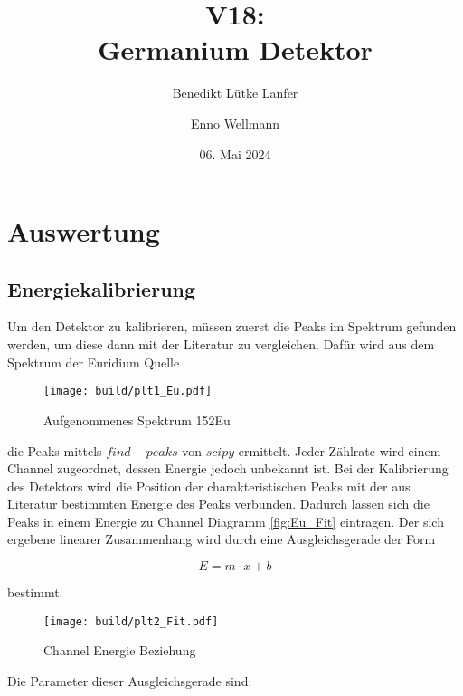 

\title{V18:\\ Germanium Detektor}
\author{Benedikt Lütke Lanfer \and Enno Wellmann}
\date{06. Mai 2024}
\publishers{TU Dortmund – Fakultät Physik}



\tableofcontents
\newpage



\newpage
\section{Auswertung}
\subsection{Energiekalibrierung}
Um den Detektor zu kalibrieren, müssen zuerst die Peaks im Spektrum gefunden
werden, um diese dann mit der Literatur zu vergleichen. Dafür wird aus dem
Spektrum der Euridium Quelle

\begin{figure}[H]
	\centering
	\texttt{[image: build/plt1\_Eu.pdf]}
	\caption{Aufgenommenes Spektrum 152Eu}\label{fig:Eu_spektrum}
\end{figure}

die Peaks mittels $find-peaks$ von $scipy$ \cite{scipy} ermittelt. Jeder
Zählrate wird einem Channel zugeordnet, dessen Energie jedoch unbekannt ist.
Bei der Kalibrierung des Detektors wird die Position der charakteristischen
Peaks mit der aus Literatur \cite{web:Eu} bestimmten Energie des Peaks
verbunden. Dadurch lassen sich die Peaks in einem Energie zu Channel Diagramm
\eqref{fig:Eu_Fit} eintragen. Der sich ergebene linearer Zusammenhang wird
durch eine Ausgleichsgerade der Form

\begin{equation}
	E=m \cdot x +b
\end{equation}

bestimmt.

\begin{figure}[H]
	\centering
	\texttt{[image: build/plt2\_Fit.pdf]}
	\caption{Channel Energie Beziehung}\label{fig:Eu_Fit}
\end{figure}

Die Parameter dieser Ausgleichsgerade sind:


